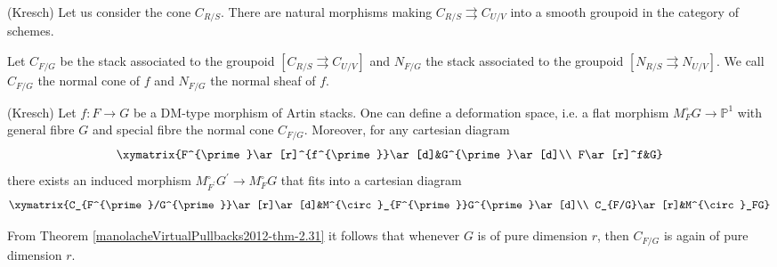 \begin{proposition}\label{manolacheVirtualPullbacks2012-prop-2.29}
 (Kresch) Let us consider the cone $C_{R/S}$. There are natural morphisms making $C_{R/S}\rightrightarrows C_{U/V}$ into a smooth groupoid in the category of schemes.
\end{proposition}

\begin{definition}\label{manolacheVirtualPullbacks2012-def-2.30}
\label{manolacheVirtualPullbacks2012-kresch}
 Let $C_{F/G}$ be the stack associated to the groupoid $[C_{R/S}\rightrightarrows C_{U/V}]$ and $N_{F/G}$ the stack associated to the groupoid $[N_{R/S}\rightrightarrows N_{U/V}]$. We call $C_{F/G}$ the normal cone of $f$ and $N_{F/G}$ the normal sheaf of $f$.
\end{definition}

\begin{theorem}\label{manolacheVirtualPullbacks2012-thm-2.31}
\label{manolacheVirtualPullbacks2012-family} (Kresch)
 Let $f:F\to G$ be a DM-type morphism of Artin stacks. One can define a deformation space, i.e. a flat morphism $M^{\circ}_FG\to\mathbb{P}^1$ with general fibre $G$ and special fibre the normal cone $C_{F/G}$. Moreover, for any cartesian diagram
\begin{equation*}
\xymatrix{F^{\prime}\ar[r]^{f^{\prime}}\ar[d]&G^{\prime}\ar[d]\\
F\ar[r]^f&G}
\end{equation*}
there exists an induced morphism $M^{\circ}_{F^{\prime}}G^{\prime}\to M^{\circ}_FG$ that fits into a cartesian diagram
\begin{equation*}
\xymatrix{C_{F^{\prime}/G^{\prime}}\ar[r]\ar[d]&M^{\circ}_{F^{\prime}}G^{\prime}\ar[d]\\
C_{F/G}\ar[r]&M^{\circ}_FG}
\end{equation*}
\end{theorem}

\begin{remark}\label{manolacheVirtualPullbacks2012-rem-2.32}
From Theorem \ref{manolacheVirtualPullbacks2012-thm-2.31} it follows that whenever $G$ is of pure dimension $r$, then $C_{F/G}$ is again of pure dimension $r$.
\end{remark}

